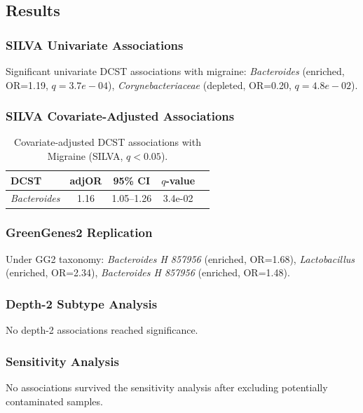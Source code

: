 \documentclass[11pt,a4paper]{article}
\begin{document}
\subsection{Results}
\subsubsection{SILVA Univariate Associations}
Significant univariate DCST associations with migraine: \textit{Bacteroides} (enriched, OR=1.19, $q=3.7e-04$), \textit{Corynebacteriaceae} (depleted, OR=0.20, $q=4.8e-02$).

\subsubsection{SILVA Covariate-Adjusted Associations}
\begin{table}[H]\centering\small
\caption{Covariate-adjusted DCST associations with Migraine (SILVA, $q<0.05$).}\label{tab:Migraine_adj}
\begin{tabular}{lcccc}
\toprule
DCST & adjOR & 95\% CI & $q$-value \\
\midrule
\textit{Bacteroides} & 1.16 & 1.05--1.26 & 3.4e-02 \\
\bottomrule
\end{tabular}\end{table}

\subsubsection{GreenGenes2 Replication}
Under GG2 taxonomy: \textit{Bacteroides H 857956} (enriched, OR=1.68), \textit{Lactobacillus} (enriched, OR=2.34), \textit{Bacteroides H 857956} (enriched, OR=1.48).

\subsubsection{Depth-2 Subtype Analysis}
No depth-2 associations reached significance.

\subsubsection{Sensitivity Analysis}
No associations survived the sensitivity analysis after excluding potentially contaminated samples.
\end{document}
